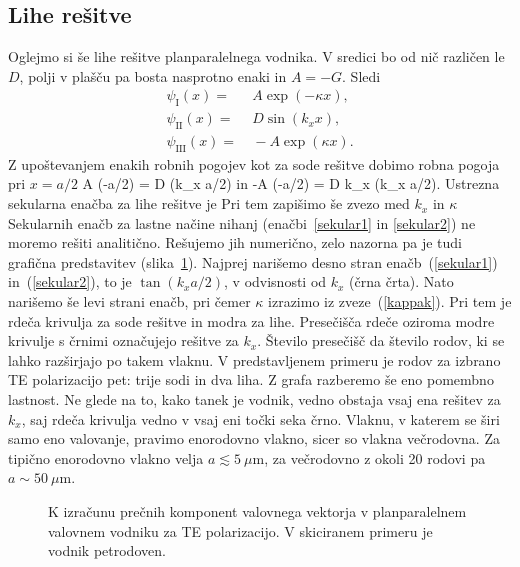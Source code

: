 \subsection*{Lihe rešitve}
Oglejmo si še lihe rešitve planparalelnega vodnika. V sredici bo od nič različen
le $D$, polji v plašču pa bosta nasprotno enaki in $A = -G$. Sledi
\begin{align}
\psi_{\mathrm{I}}(x) =&~ A \exp(-\kappa x),\\
\psi_{\mathrm{II}}(x) =&~ D \sin(k_x x),\\
\psi_{\mathrm{III}}(x) =&~ -A \exp(\kappa x).
\end{align}
Z upoštevanjem enakih robnih pogojev kot za sode rešitve dobimo robna pogoja pri $x=a/2$
\beq
A \exp(-\kappa a/2) = D \sin(k_x a/2)
\eeq
in 
\beq
-\kappa A \exp(-\kappa a/2) = D k_x \cos(k_x a/2).
\eeq
Ustrezna sekularna enačba za lihe rešitve je 
Pri tem zapišimo še zvezo med $k_x$ in $\kappa$
Sekularnih enačb za lastne načine nihanj (enačbi~\ref{sekular1} in \ref{sekular2}) ne moremo rešiti 
analitično. Rešujemo jih numerično, zelo nazorna pa je tudi grafična predstavitev (slika~\ref{fig:TEsec}). 
Najprej narišemo desno stran enačb~(\ref{sekular1}) in~(\ref{sekular2}), to je $\tan (k_x a/2)$, v odvisnosti
od $k_x$ (črna črta). Nato narišemo še levi strani enačb, pri čemer $\kappa$ izrazimo iz zveze~(\ref{kappak}).
Pri tem je rdeča krivulja za sode rešitve in modra za lihe. Presečišča rdeče oziroma modre krivulje s črnimi
označujejo rešitve za $k_x$. Število presečišč da število rodov, ki se lahko razširjajo po takem vlaknu. 
V predstavljenem primeru je rodov za izbrano TE polarizacijo pet: trije sodi in dva liha. Z grafa razberemo 
še eno pomembno lastnost. Ne glede na to, kako tanek je vodnik, vedno obstaja vsaj ena rešitev za $k_x$, 
saj rdeča krivulja vedno v vsaj eni točki seka črno. Vlaknu, v katerem se širi samo eno valovanje, 
pravimo enorodovno vlakno, sicer so vlakna večrodovna. Za tipično enorodovno vlakno velja 
$a\lesssim 5~\mu$m, za večrodovno z okoli 20 rodovi pa $a\sim 50~\mu$m.
\begin{figure}[h]
\centering
\def\svgwidth{90truemm} 

\caption{K izračunu prečnih komponent valovnega vektorja v planparalelnem valovnem vodniku
za TE polarizacijo. V skiciranem primeru je vodnik petrodoven.}
\label{fig:TEsec}
\end{figure}

